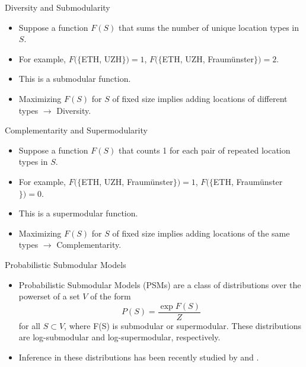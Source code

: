 \documentclass{beamer}
\begin{document}
\begin{frame}{Diversity and Submodularity}
  \begin{itemize}
    \item Suppose a function $F(S)$ that sums the number of unique location types in $S$.
    \item For example, $F(\{$ETH, UZH$\}) = 1$, $F(\{$ETH, UZH, Fraumünster$\}) = 2$.
    \pause
    \item This is a submodular function.
    \pause
    \item Maximizing $F(S)$ for $S$ of fixed size implies adding locations of different types $\rightarrow$ Diversity.
  \end{itemize}
\end{frame}

\begin{frame}{Complementarity and Supermodularity}
  \begin{itemize}
    \item Suppose a function $F(S)$ that counts 1 for each pair of repeated location types in $S$.
    \item For example, $F(\{$ETH, UZH, Fraumünster$\}) = 1$, $F(\{$ETH, Fraumünster$\}) = 0$.
    \pause
    \item This is a supermodular function. 
    \pause
    \item Maximizing $F(S)$ for $S$ of fixed size implies adding locations of the same types $\rightarrow$ Complementarity.
  \end{itemize}
\end{frame}

\begin{frame}{Probabilistic Submodular Models}
  \begin{itemize}
    \item Probabilistic Submodular Models (PSMs) are a class of distributions over the powerset of a set $V$ of the form
      \begin{equation*}
      P(S) = \frac{\exp{F(S)}}{Z}
      \end{equation*}
     for all $S \subset V$,  where F(S) is submodular or supermodular. These distributions are log-submodular and log-supermodular, respectively.
   
     \item Inference in these distributions has been recently studied by \cite{djolonga15scalable} and \cite{gotovos15sampling}.
  \end{itemize}
\end{frame}
\end{document}
